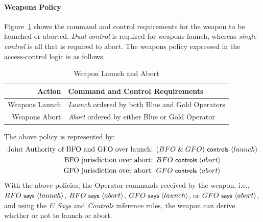\paragraph*{Weapons Policy}

Figure~\ref{tab:weapon-launch-abort} shows the command and control
requirements for the weapon to be launched or aborted. \emph{Dual
  control} is required for weapons launch, whereas \emph{single
  control} is all that is required to abort. The weapons policy
expressed in the access-control logic is as follows.
\begin{table}[tb]
  \centering
  \begin{center}
  \begin{tabular}[h]{|r|l|}
    \hline
    \textbf{Action} & \textbf{Command and Control Requirements}\\
    \hline
    Weapons Launch & \emph{Launch} ordered by both Blue and Gold Operators\\
    Weapons Abort & \emph{Abort} ordered by either Blue or Gold Operator\\
    \hline
  \end{tabular}
\end{center}

\caption{Weapon Launch and Abort}
\label{tab:weapon-launch-abort}
\end{table}


The above policy is represented by:
\begin{align*}
\text{Joint Authority of BFO and GFO over launch: } & (BFO \;\&\; GFO) \text{\small\textsf{ controls }} \langle launch \rangle\\
\text{BFO jurisdiction over abort: } & BFO \text{\small\textsf{ controls }} \langle abort \rangle\\
\text{GFO jurisdiction over abort: } & GFO \text{\small\textsf{ controls }} \langle abort \rangle
\end{align*}
With the above policies, the Operator commands received by the weapon,
i.e., $BFO \text{\small\textsf{ says }} \langle launch \rangle$, $BFO \text{\small\textsf{ says }} \langle abort \rangle$, $GFO
\text{\small\textsf{ says }} \langle launch \rangle$, or $GFO \text{\small\textsf{ says }} \langle abort \rangle$, and using the
\emph{\& Says} and \emph{Controls} inference rules, the weapon can
derive whether or not to launch or abort.

